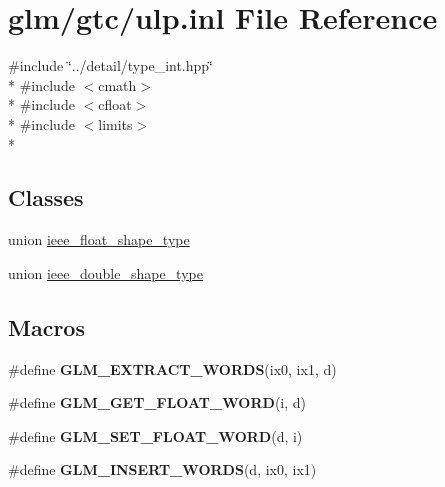 \hypertarget{ulp_8inl}{\section{glm/gtc/ulp.inl File Reference}
\label{ulp_8inl}
}
{\ttfamily \#include \char`\"{}../detail/type\-\_\-int.\-hpp\char`\"{}}\\*
{\ttfamily \#include $<$cmath$>$}\\*
{\ttfamily \#include $<$cfloat$>$}\\*
{\ttfamily \#include $<$limits$>$}\\*
\subsection*{Classes}
\begin{DoxyCompactItemize}
\item 
union \hyperlink{unionieee__float__shape__type}{ieee\-\_\-float\-\_\-shape\-\_\-type}
\item 
union \hyperlink{unionieee__double__shape__type}{ieee\-\_\-double\-\_\-shape\-\_\-type}
\end{DoxyCompactItemize}
\subsection*{Macros}
\begin{DoxyCompactItemize}
\item 
\#define {\bfseries G\-L\-M\-\_\-\-E\-X\-T\-R\-A\-C\-T\-\_\-\-W\-O\-R\-D\-S}(ix0, ix1, d)
\item 
\#define {\bfseries G\-L\-M\-\_\-\-G\-E\-T\-\_\-\-F\-L\-O\-A\-T\-\_\-\-W\-O\-R\-D}(i, d)
\item 
\#define {\bfseries G\-L\-M\-\_\-\-S\-E\-T\-\_\-\-F\-L\-O\-A\-T\-\_\-\-W\-O\-R\-D}(d, i)
\item 
\#define {\bfseries G\-L\-M\-\_\-\-I\-N\-S\-E\-R\-T\-\_\-\-W\-O\-R\-D\-S}(d, ix0, ix1)
\end{DoxyCompactItemize}
